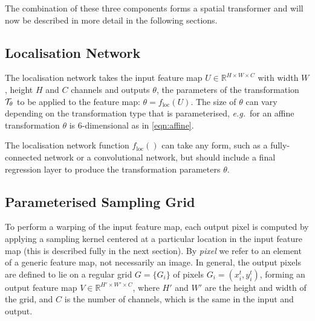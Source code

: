 \documentclass{article} %
\def\eg{\emph{e.g.}}
\begin{document}
The combination of these three components forms a spatial transformer and
will now be described in more detail in the following sections.

\subsection{Localisation Network}\label{sec:locnet}

The localisation network takes the input feature map $U \in \mathbb{R}^{H \times
W \times C}$ with width $W$, height $H$ and $C$ channels and outputs $\theta$,
the parameters of the transformation ${\cal T}_\theta$ to be applied to the
feature map: $\theta = f_\text{loc}(U)$. The size of $\theta$ can vary depending
on the transformation type that is parameterised, \eg~for an affine
transformation $\theta$ is 6-dimensional as in \eqref{eqn:affine}.

The localisation network function $f_\text{loc}()$ can take any form, such as a
fully-connected network or a convolutional network, but should include a final
regression layer to produce the transformation parameters $\theta$.

\subsection{Parameterised Sampling Grid}\label{sec:affinegrid}

To perform a warping of the input feature map, each output pixel is computed by applying a sampling kernel centered at a particular
location in the input feature map (this is described fully in the next
section). By \emph{pixel} we refer to an element of a generic feature map, not necessarily an image. In general, the output pixels are defined to lie on a regular
grid $G = \{G_i\}$ of pixels $G_{i} =
(x_i^t, y_i^t)$, forming an output feature map
$V \in \mathbb{R}^{H' \times W' \times C}$, where
$H'$ and $W'$ are the height and width of the grid, and $C$ is the number of
channels, which is the same in the input and output.
\end{document}

